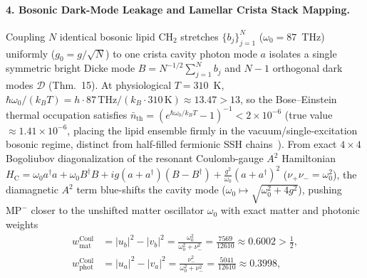 \documentclass[10pt,twocolumn]{article}
\begin{document}
\paragraph{4. Bosonic Dark-Mode Leakage and Lamellar Crista Stack Mapping.}
Coupling $N$ identical bosonic lipid $\text{CH}_2$ stretches $\{b_j\}_{j=1}^N$ ($\omega_0 = 87$~THz) uniformly ($g_0 = g/\sqrt{N}$) to one crista cavity photon mode $a$ isolates a single symmetric bright Dicke mode $B = N^{-1/2}\sum_{j=1}^N b_j$ and $N-1$ orthogonal dark modes $\mathcal{D}$ (Thm.~15). At physiological $T = 310$~K, $\hbar\omega_0/(k_B T) = h\cdot 87\,\mathrm{THz}/(k_B\cdot 310\,\mathrm{K}) \approx 13.47 > 13$, so the Bose--Einstein thermal occupation satisfies $\bar{n}_{\mathrm{th}} = (e^{\hbar\omega_0/k_B T}-1)^{-1} < 2\times 10^{-6}$ (true value $\approx 1.41\times 10^{-6}$, placing the lipid ensemble firmly in the vacuum/single-excitation bosonic regime, distinct from half-filled fermionic SSH chains~\cite{Eriksson2026ManyBodyFilling}). From exact $4\times 4$ Bogoliubov diagonalization of the resonant Coulomb-gauge $A^2$ Hamiltonian $H_{\mathrm{C}} = \omega_0 a^\dagger a + \omega_0 B^\dagger B + ig(a+a^\dagger)(B-B^\dagger) + \frac{g^2}{\omega_0}(a+a^\dagger)^2$ ($\nu_+\nu_- = \omega_0^2$), the diamagnetic $A^2$ term blue-shifts the cavity mode ($\omega_0 \mapsto \sqrt{\omega_0^2+4g^2}$), pushing $\mathrm{MP}^-$ closer to the unshifted matter oscillator $\omega_0$ with exact matter and photonic weights
\begin{equation}
\label{eq:filled}
\begin{aligned}
w_{\mathrm{mat}}^{\mathrm{Coul}} &= |u_b|^2 - |v_b|^2 = \frac{\omega_0^2}{\omega_0^2 + \nu_-^2} = \frac{7569}{12610} \approx 0.6002 > \frac{1}{2}, \\
w_{\mathrm{phot}}^{\mathrm{Coul}} &= |u_a|^2 - |v_a|^2 = \frac{\nu_-^2}{\omega_0^2 + \nu_-^2} = \frac{5041}{12610} \approx 0.3998,
\end{aligned}
\end{equation}
\end{document}
